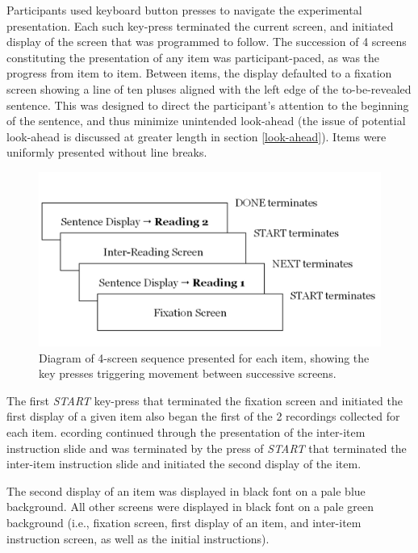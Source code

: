 \documentclass[12pt,oneside]{book}
\begin{document}
Participants used keyboard button presses to navigate the experimental presentation. Each such key-press terminated the current screen, and initiated display of the screen that was programmed to follow. The succession of 4 screens constituting the presentation of any item was participant-paced, as was the progress from item to item. Between items, the display defaulted to a fixation screen showing a line of ten pluses aligned with the left edge of the to-be-revealed sentence. This was designed to direct the participant's attention to the beginning of the sentence, and thus minimize unintended look-ahead (the issue of potential look-ahead is discussed at greater length in section \ref{look-ahead}). Items were uniformly presented without line breaks.

\begin{figure}
\centering
\includegraphics{procedure-diagram.png}
\caption{\label{fig:screens}Diagram of 4-screen sequence presented for each item, showing the key presses triggering movement between successive screens.}
\end{figure}

The first \emph{START} key-press that terminated the fixation screen and initiated the first display of a given item also began the first of the 2 recordings collected for each item. ecording continued through the presentation of the inter-item instruction slide and was terminated by the press of \emph{START} that terminated the inter-item instruction slide and initiated the second display of the item.

The second display of an item was displayed in black font on a pale blue background. All other screens were displayed in black font on a pale green background (i.e., fixation screen, first display of an item, and inter-item instruction screen, as well as the initial instructions).
\end{document}
